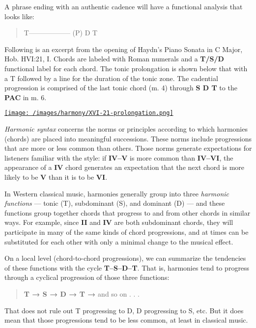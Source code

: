 \documentclass{book}
\begin{document}
A phrase ending with an authentic cadence will have a functional analysis that
looks like:

\begin{quote}
T------------------ (P) D T
\end{quote}

Following is an excerpt from the opening of Haydn's Piano Sonata in C Major,
Hob. HVI:21, I. Chords are labeled with Roman numerals and a \textbf{T/S/D}
functional label for each chord. The tonic prolongation is shown below that
with a T followed by a line for the duration of the tonic zone. The cadential
progression is comprised of the last tonic chord (m. 4) through \textbf{S D T}
to the \textbf{PAC} in m. 6.

\href{/images/harmony/XVI-21-prolongation.png}{\texttt{[image: /images/harmony/XVI-21-prolongation.png]}}

\emph{Harmonic syntax} concerns the norms or principles according to which
harmonies (chords) are placed into meaningful successions. These norms include
progressions that are more or less common than others. Those norms generate
expectations for listeners familiar with the style: if \textbf{IV--V} is more
common than \textbf{IV--VI}, the appearance of a \textbf{IV} chord generates
an expectation that the next chord is more likely to be \textbf{V} than it is
to be \textbf{VI}.

In Western classical music, harmonies generally group into three
\emph{harmonic functions} --- tonic (T), subdominant (S), and dominant (D) ---
and these functions group together chords that progress to and from other
chords in similar ways. For example, since \textbf{II} and \textbf{IV} are
both subdominant chords, they will participate in many of the same kinds of
chord progressions, and at times can be substituted for each other with only a
minimal change to the musical effect.

On a local level (chord-to-chord progressions), we can summarize the
tendencies of these functions with the cycle \textbf{T--S--D--T}. That is,
harmonies tend to progress through a cyclical progression of those three
functions:

\begin{quote}
\textbf{T → S → D → T →} and so on . . .
\end{quote}

That does not rule out T progressing to D, D progressing to S, etc. But it
does mean that those progressions tend to be less common, at least in
classical music.
\end{document}
